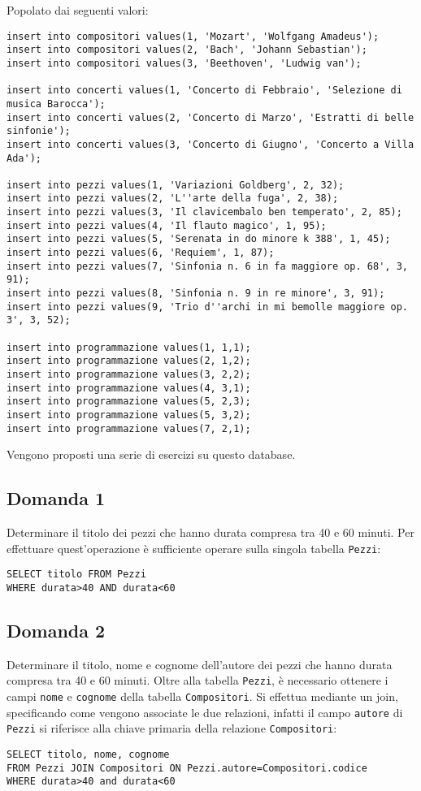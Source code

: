 \documentclass{article}
\numberwithin{equation}{subsection}
\begin{document}
Popolato dai seguenti valori:
\begin{verbatim}
insert into compositori values(1, 'Mozart', 'Wolfgang Amadeus');
insert into compositori values(2, 'Bach', 'Johann Sebastian');
insert into compositori values(3, 'Beethoven', 'Ludwig van');

insert into concerti values(1, 'Concerto di Febbraio', 'Selezione di musica Barocca');
insert into concerti values(2, 'Concerto di Marzo', 'Estratti di belle sinfonie');
insert into concerti values(3, 'Concerto di Giugno', 'Concerto a Villa Ada');

insert into pezzi values(1, 'Variazioni Goldberg', 2, 32);
insert into pezzi values(2, 'L''arte della fuga', 2, 38);
insert into pezzi values(3, 'Il clavicembalo ben temperato', 2, 85);
insert into pezzi values(4, 'Il flauto magico', 1, 95);
insert into pezzi values(5, 'Serenata in do minore k 388', 1, 45);
insert into pezzi values(6, 'Requiem', 1, 87);
insert into pezzi values(7, 'Sinfonia n. 6 in fa maggiore op. 68', 3, 91);
insert into pezzi values(8, 'Sinfonia n. 9 in re minore', 3, 91);
insert into pezzi values(9, 'Trio d''archi in mi bemolle maggiore op. 3', 3, 52);

insert into programmazione values(1, 1,1);
insert into programmazione values(2, 1,2);
insert into programmazione values(3, 2,2);
insert into programmazione values(4, 3,1);
insert into programmazione values(5, 2,3);
insert into programmazione values(5, 3,2);
insert into programmazione values(7, 2,1);
\end{verbatim}

Vengono proposti una serie di esercizi su questo database. 

\subsection*{Domanda 1}
Determinare il titolo dei pezzi che hanno durata compresa tra 40 e 60 minuti. Per effettuare quest'operazione è sufficiente operare sulla singola tabella \verb|Pezzi|:
\begin{verbatim}
SELECT titolo FROM Pezzi
WHERE durata>40 AND durata<60
\end{verbatim}

\subsection*{Domanda 2}
Determinare il titolo, nome e cognome dell'autore dei pezzi che hanno durata compresa tra 40 e 60 minuti. Oltre alla tabella \verb|Pezzi|, è necessario ottenere i campi 
\verb|nome| e \verb|cognome| della tabella \verb|Compositori|. Si effettua mediante un join, specificando come vengono associate le due relazioni, infatti il campo \verb|autore| 
di \verb|Pezzi| si riferisce alla chiave primaria della relazione \verb|Compositori|:
\begin{verbatim}
SELECT titolo, nome, cognome  
FROM Pezzi JOIN Compositori ON Pezzi.autore=Compositori.codice
WHERE durata>40 and durata<60
\end{verbatim}
\end{document}
